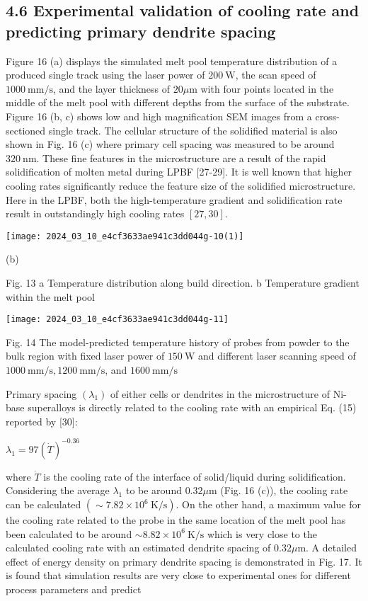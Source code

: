 \documentclass[10pt]{article}
\begin{document}
\subsection*{4.6 Experimental validation of cooling rate and predicting primary dendrite spacing}
Figure 16 (a) displays the simulated melt pool temperature distribution of a produced single track using the laser power of $200 \mathrm{~W}$, the scan speed of $1000 \mathrm{~mm} / \mathrm{s}$, and the layer thickness of $20 \mu \mathrm{m}$ with four points located in the middle of the melt pool with different depths from the surface of the substrate. Figure 16 (b, c) shows low and high magnification SEM images from a cross-sectioned single track. The cellular structure of the solidified material is also shown in Fig. 16 (c) where primary cell spacing was measured to be around $320 \mathrm{~nm}$. These fine features in the microstructure are a result of the rapid solidification of molten metal during LPBF [27-29]. It is well known that higher cooling rates significantly reduce the feature size of the solidified microstructure. Here in the LPBF, both the high-temperature gradient and solidification rate result in outstandingly high cooling rates $[27,30]$.

\begin{center}
\texttt{[image: 2024\_03\_10\_e4cf3633ae941c3dd044g-10(1)]}
\end{center}

(b)

Fig. 13 a Temperature distribution along build direction. b Temperature gradient within the melt pool

\begin{center}
\texttt{[image: 2024\_03\_10\_e4cf3633ae941c3dd044g-11]}
\end{center}

Fig. 14 The model-predicted temperature history of probes from powder to the bulk region with fixed laser power of $150 \mathrm{~W}$ and different laser scanning speed of $1000 \mathrm{~mm} / \mathrm{s}, 1200 \mathrm{~mm} / \mathrm{s}$, and $1600 \mathrm{~mm} / \mathrm{s}$

Primary spacing $\left(\lambda_{1}\right)$ of either cells or dendrites in the microstructure of Ni-base superalloys is directly related to the cooling rate with an empirical Eq. (15) reported by [30]:

$\lambda_{1}=97(\dot{T})^{-0.36}$

where $\dot{T}$ is the cooling rate of the interface of solid/liquid during solidification. Considering the average $\lambda_{1}$ to be around $0.32 \mu \mathrm{m}$ (Fig. 16 (c)), the cooling rate can be calculated $\left(\sim 7.82 \times 10^{6} \mathrm{~K} / \mathrm{s}\right)$. On the other hand, a maximum value for the cooling rate related to the probe in the same location of the melt pool has been calculated to be around $\sim 8.82 \times 10^{6} \mathrm{~K} / \mathrm{s}$ which is very close to the calculated cooling rate with an estimated dendrite spacing of $0.32 \mu \mathrm{m}$. A detailed effect of energy density on primary dendrite spacing is demonstrated in Fig. 17. It is found that simulation results are very close to experimental ones for different process parameters and predict
\end{document}
